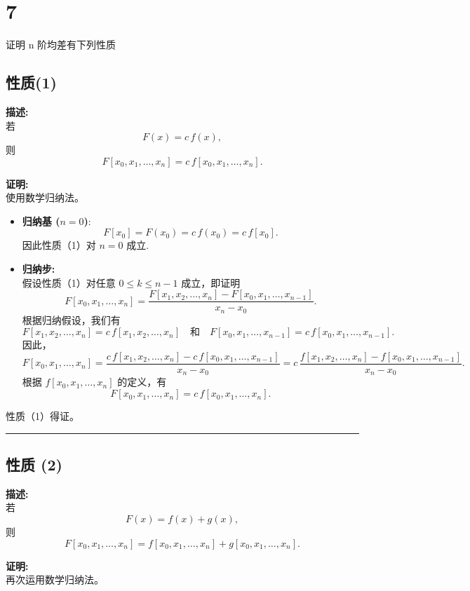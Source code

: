 \documentclass[11pt]{article}
\begin{document}
    \section{7}\label{section}

证明 n 阶均差有下列性质

\subsection{性质(1)}\label{ux6027ux8d281}

\textbf{描述:}\\
若 \[
F(x)= c\, f(x),
\] 则 \[
F[x_0,x_1,\dots,x_n] = c\,f[x_0,x_1,\dots,x_n].
\]

\textbf{证明:}\\
使用数学归纳法。

\begin{itemize}
\item
  \textbf{归纳基 (\(n=0\))}:\\
  \[
  F[x_0] = F(x_0) = c\, f(x_0) = c\, f[x_0].
  \] 因此性质（1）对 \(n=0\) 成立.
\item
  \textbf{归纳步:}\\
  假设性质（1）对任意 \(0\le k \le n-1\) 成立，即证明 \[
  F[x_0,x_1,\dots,x_n] = \frac{F[x_1,x_2,\dots,x_n] - F[x_0,x_1,\dots,x_{n-1}]}{x_n - x_0}.
  \] 根据归纳假设，我们有 \[
  F[x_1,x_2,\dots,x_n] = c \, f[x_1,x_2,\dots,x_n] \quad\text{和}\quad F[x_0,x_1,\dots,x_{n-1}] = c\, f[x_0,x_1,\dots,x_{n-1}].
  \] 因此， \[
  F[x_0,x_1,\dots,x_n] = \frac{ c\, f[x_1,x_2,\dots,x_n] - c\, f[x_0,x_1,\dots,x_{n-1}]}{x_n-x_0} = c\, \frac{f[x_1,x_2,\dots,x_n]- f[x_0,x_1,\dots,x_{n-1}]}{x_n-x_0}.
  \] 根据 \(f[x_0,x_1,\dots,x_n]\) 的定义，有 \[
  F[x_0,x_1,\dots,x_n] = c\,f[x_0,x_1,\dots,x_n].
  \]
\end{itemize}

性质（1）得证。

\begin{center}\rule{0.5\linewidth}{0.5pt}\end{center}

\subsection{性质 (2)}\label{ux6027ux8d28-2}

\textbf{描述:}\\
若 \[
F(x) = f(x)+g(x),
\] 则 \[
F[x_0,x_1,\dots,x_n]= f[x_0,x_1,\dots,x_n]+g[x_0,x_1,\dots,x_n].
\]

\textbf{证明:}\\
再次运用数学归纳法。
\end{document}
